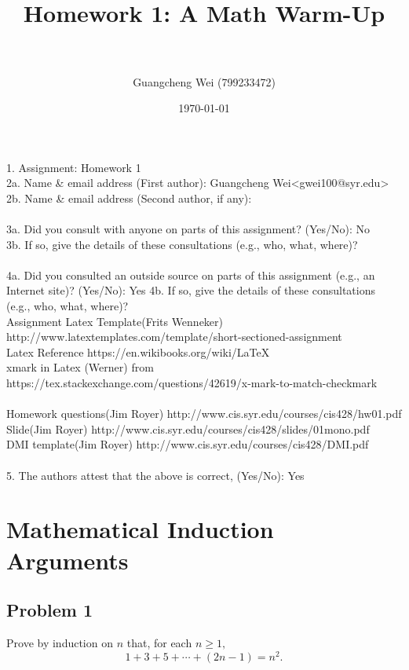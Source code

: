 \documentclass[paper=a4, fontsize=11pt]{scrartcl} %
\title{ 
\horrule{0.5pt} \\[0.4cm] %
\huge Homework 1: A Math Warm-Up \\ %
\horrule{2pt} \\[0.5cm] %
}
\author{Guangcheng Wei (799233472)} %
\date{\normalsize\today} %
\newcommand{\xmark}{\ding{55}}%
\numberwithin{equation}{section} %
\numberwithin{figure}{section} %
\numberwithin{table}{section} %
\newcommand{\problem}[1]{\subsection *{Problem #1}}
\begin{document}
\maketitle %

1.  Assignment: Homework 1\\

2a. Name \& email address (First author): Guangcheng Wei<gwei100@syr.edu> \\
2b. Name \& email address (Second author, if any):\\
\\
3a. Did you consult with anyone on parts of this assignment? (Yes/No): No\\
3b. If so, give the details of these consultations (e.g., who, what,    where)?\\
\\
4a. Did you consulted an outside source on parts of this assignment     (e.g., an Internet site)?  (Yes/No): Yes
4b. If so, give the details of these consultations (e.g., who, what,     where)?
\\
Assignment Latex Template(Frits Wenneker) http://www.latextemplates.com/template/short-sectioned-assignment\\
Latex Reference https://en.wikibooks.org/wiki/LaTeX\\
xmark \xmark in Latex (Werner) from https://tex.stackexchange.com/questions/42619/x-mark-to-match-checkmark\\
\\
Homework questions(Jim Royer) http://www.cis.syr.edu/courses/cis428/hw01.pdf\\
Slide(Jim Royer) http://www.cis.syr.edu/courses/cis428/slides/01mono.pdf\\
DMI template(Jim Royer) http://www.cis.syr.edu/courses/cis428/DMI.pdf\\
\\
5.  The authors attest that the above is correct, (Yes/No): Yes\\

\pagebreak
\section {Mathematical Induction Arguments}

\problem 1 Prove by induction on $n$ that, for each $n \geq 1,$
\[1+3+5+\cdots+(2n-1) = n^2.\]
\end{document}

